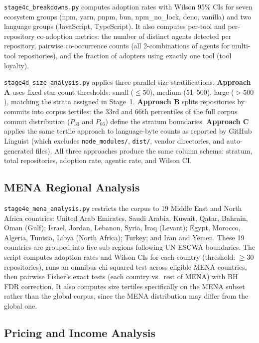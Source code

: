 \texttt{stage4c\_breakdowns.py} computes adoption rates with Wilson 95\% CIs for seven ecosystem groups (npm, yarn, pnpm, bun, npm\_no\_lock, deno, vanilla) and two language groups (JavaScript, TypeScript). It also computes per-tool and per-repository co-adoption metrics: the number of distinct agents detected per repository, pairwise co-occurrence counts (all 2-combinations of agents for multi-tool repositories), and the fraction of adopters using exactly one tool (tool loyalty).

\texttt{stage4d\_size\_analysis.py} applies three parallel size stratifications. \textbf{Approach A} uses fixed star-count thresholds: small ($\leq 50$), medium (51--500), large ($> 500$), matching the strata assigned in Stage~1. \textbf{Approach B} splits repositories by commits into corpus tertiles: the 33rd and 66th percentiles of the full corpus commit distribution ($P_{33}$ and $P_{66}$) define the stratum boundaries. \textbf{Approach C} applies the same tertile approach to language-byte counts as reported by GitHub Linguist (which excludes \texttt{node\_modules/}, \texttt{dist/}, vendor directories, and auto-generated files). All three approaches produce the same column schema: stratum, total repositories, adoption rate, agentic rate, and Wilson CI.

\subsection{MENA Regional Analysis}

\texttt{stage4e\_mena\_analysis.py} restricts the corpus to 19 Middle East and North Africa countries: United Arab Emirates, Saudi Arabia, Kuwait, Qatar, Bahrain, Oman (Gulf); Israel, Jordan, Lebanon, Syria, Iraq (Levant); Egypt, Morocco, Algeria, Tunisia, Libya (North Africa); Turkey; and Iran and Yemen. These 19 countries are grouped into five sub-regions following UN ESCWA boundaries. The script computes adoption rates and Wilson CIs for each country (threshold: $\geq 30$ repositories), runs an omnibus chi-squared test across eligible MENA countries, then pairwise Fisher's exact tests (each country vs.\ rest of MENA) with BH FDR correction. It also computes size tertiles specifically on the MENA subset rather than the global corpus, since the MENA distribution may differ from the global one.

\subsection{Pricing and Income Analysis}

